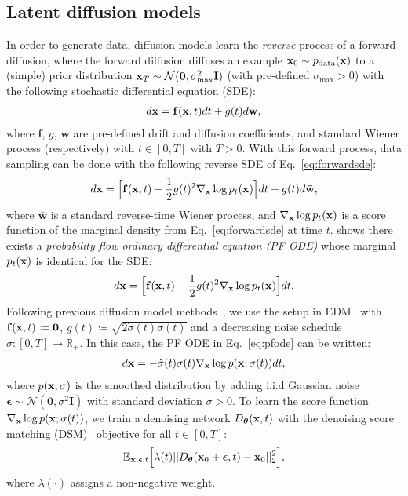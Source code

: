 \subsection{Latent diffusion models}
\label{subsec:ldm}
In order to generate data, 
diffusion models learn the \emph{reverse} process of a forward diffusion, where the forward diffusion diffuses an 
example $\mathbf{x}_{0} \sim p_{\text{data}}(\mathbf{x})$ to a (simple) prior distribution $\mathbf{x}_{T} \sim \mathcal{N}(\mathbf{0}, \sigma_{\mathrm{max}}^2 \mathbf{I})$ (with pre-defined $\sigma_{\mathrm{max}}>0$) with the following stochastic differential equation (SDE):
\begin{align}
    d\mathbf{x} = \mathbf{f} (\mathbf{x}, t) dt + g(t) d\mathbf{w},
    \label{eq:forwardsde}
\end{align}
where $\mathbf{f}$, $g$, $\mathbf{w}$ are pre-defined drift and diffusion coefficients, and standard Wiener process (respectively) with $t \in [0, T]$ with $T>0$. 
With this forward process, data sampling can be done with the following reverse SDE of Eq.~\eqref{eq:forwardsde}: 
\begin{align}
    d\mathbf{x} = \Big[ \mathbf{f} (\mathbf{x}, t) - \frac{1}{2} g(t)^2 \nabla_{\mathbf{x}} \log p_t (\mathbf{x}) \Big] dt + g(t) d\mathbf{\bar{w}},
\end{align}
where $\mathbf{\bar{w}}$ is a standard reverse-time Wiener process, and $\nabla_{\mathbf{x}} \log p_t(\mathbf{x})$ is a score function of the marginal density from Eq.~\eqref{eq:forwardsde} at time $t$.
\citet{song2021scorebased} shows there exists a \emph{probability flow ordinary differential equation (PF ODE)}
whose marginal $p_t (\mathbf{x})$ is identical for the SDE:
\begin{align}
    d\mathbf{x} = \Big[ \mathbf{f} (\mathbf{x}, t) - \frac{1}{2} g(t)^2 \nabla_{\mathbf{x}} \log p_t (\mathbf{x}) \Big] dt.
    \label{eq:pfode}
\end{align}
Following previous diffusion model methods~\citep{lee2024dreamflow,zheng2024fast}, we use the setup in EDM~\citep{karras2022edm} with $\mathbf{f} (\mathbf{x}, t) \coloneqq \mathbf{0}$, $g(t)\coloneqq \sqrt{2\dot\sigma(t)\sigma(t)}$ and a decreasing noise schedule $\sigma: [0, T] \to \mathbb{R}_{+}$. In this case, the PF ODE in Eq.~\eqref{eq:pfode} can be written:
\begin{align}
    d\mathbf{x} = -\dot\sigma(t)\sigma(t)\nabla_{\mathbf{x}}\log p (\mathbf{x}; \sigma(t)) dt,
\end{align}
where  $p(\mathbf{x}; \sigma)$ is
the smoothed distribution by adding i.i.d Gaussian noise $\bm{\epsilon}\sim\mathcal{N}(\mathbf{0}, \sigma^2 \mathbf{I})$ with standard deviation $\sigma > 0$. To learn the score function $\nabla_{\mathbf{x}}\log p (\mathbf{x}; \sigma(t))$, we train a denoising network $D_{\bm{\theta}} (\mathbf{x}, t)$ with the denoising score matching (DSM)~\citep{song2019generative} objective for all $t \in [0, T]$:
\begin{align*}
\mathbb{E}_{\mathbf{x}, \bm{\epsilon}, t}\Big[ \lambda({t}) || D_{\bm{\theta}}(\mathbf{x}_0 + \bm{\epsilon}, t)  - \mathbf{\mathbf{x}}_0||_2^2 \Big],
\end{align*}
where $\lambda(\cdot)$ assigns a non-negative weight.

